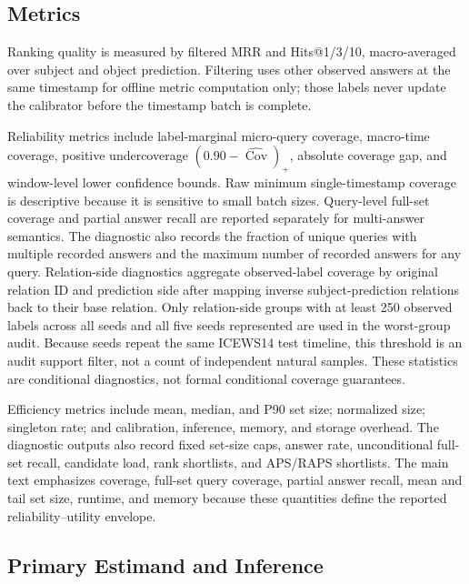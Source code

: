 \documentclass[information,article,submit,oneauthor,pdftex]{Definitions/mdpi}
\newcommand{\cov}{\operatorname{Cov}}
\begin{document}
\subsection{Metrics}

Ranking quality is measured by filtered MRR and Hits@1/3/10, macro-averaged over
subject and object prediction. Filtering uses other observed answers at the same
timestamp for offline metric computation only; those labels never update the
calibrator before the timestamp batch is complete.

Reliability metrics include label-marginal micro-query coverage, macro-time
coverage, positive undercoverage \((0.90-\widehat{\cov})_+\), absolute coverage
gap, and window-level lower confidence bounds. Raw minimum single-timestamp
coverage is descriptive because it is sensitive to small batch sizes. Query-level
full-set coverage and partial answer recall are reported separately for
multi-answer semantics. The diagnostic also records the fraction of unique
queries with multiple recorded answers and the maximum number of recorded
answers for any query.
Relation-side diagnostics aggregate observed-label coverage by original
relation ID and prediction side after mapping inverse subject-prediction
relations back to their base relation. Only relation-side groups with at least
250 observed labels across all seeds and all five seeds represented are used in
the worst-group audit. Because seeds repeat the same ICEWS14 test timeline, this
threshold is an audit support filter, not a count of independent natural
samples. These statistics are conditional diagnostics, not formal conditional
coverage guarantees.

Efficiency metrics include mean, median, and P90 set size; normalized size;
singleton rate; and calibration, inference, memory, and storage overhead.
The diagnostic outputs also record fixed set-size caps, answer rate,
unconditional full-set recall, candidate load, rank shortlists, and APS/RAPS
shortlists. The main text emphasizes coverage, full-set query coverage,
partial answer recall, mean and tail set size, runtime, and memory because
these quantities define the reported reliability--utility envelope.

\subsection{Primary Estimand and Inference}
\end{document}
